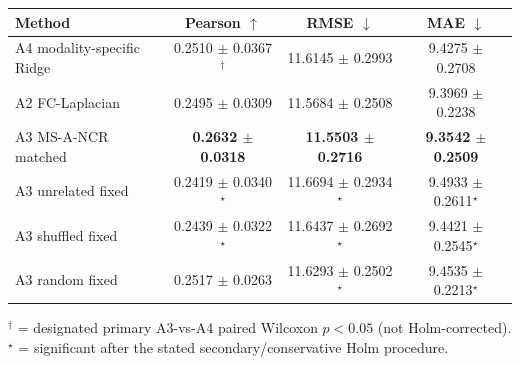 \begin{tabular}{lccc}
\toprule
Method & Pearson $\uparrow$ & RMSE $\downarrow$ & MAE $\downarrow$ \\
\midrule
A4 modality-specific Ridge & 0.2510 $\pm$ 0.0367$^{\dagger}$ & 11.6145 $\pm$ 0.2993 & 9.4275 $\pm$ 0.2708 \\
A2 FC-Laplacian & 0.2495 $\pm$ 0.0309 & 11.5684 $\pm$ 0.2508 & 9.3969 $\pm$ 0.2238 \\
A3 MS-A-NCR matched & \textbf{0.2632 $\pm$ 0.0318} & \textbf{11.5503 $\pm$ 0.2716} & \textbf{9.3542 $\pm$ 0.2509} \\
A3 unrelated fixed & 0.2419 $\pm$ 0.0340$^{\star}$ & 11.6694 $\pm$ 0.2934$^{\star}$ & 9.4933 $\pm$ 0.2611$^{\star}$ \\
A3 shuffled fixed & 0.2439 $\pm$ 0.0322$^{\star}$ & 11.6437 $\pm$ 0.2692$^{\star}$ & 9.4421 $\pm$ 0.2545$^{\star}$ \\
A3 random fixed & 0.2517 $\pm$ 0.0263 & 11.6293 $\pm$ 0.2502$^{\star}$ & 9.4535 $\pm$ 0.2213$^{\star}$ \\
\bottomrule
\end{tabular}

$^{\dagger}$ = designated primary A3-vs-A4 paired Wilcoxon $p < 0.05$ (not Holm-corrected).  $^{\star}$ = significant after the stated secondary/conservative Holm procedure.